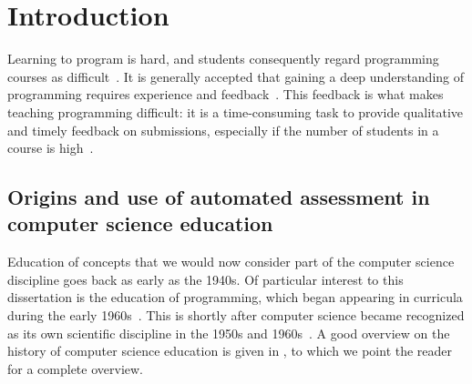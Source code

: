 \documentclass[../main]{subfiles}
\begin{document}
\chapter{Introduction}\label{ch:introduction}


Learning to program is hard, and students consequently regard programming courses as difficult~\autocite{robinsLearningTeachingProgramming2003,simoesNatureProgrammingExercises2020}.
It is generally accepted that gaining a deep understanding of programming requires experience and feedback~\autocite{gomesEnvironmentImproveProgramming2007,hattiePowerFeedback2007}.
This feedback is what makes teaching programming difficult: it is a time-consuming task to provide qualitative and timely feedback on submissions, especially if the number of students in a course is high~\autocite{zavalaUseSemanticbasedAIG2018,staubitzRepositoryOpenAutogradable2017,queirosPexilProgrammingExercises2011,pirttinenCrowdsourcingProgrammingAssignments2018,gulwaniFeedbackGenerationPerformance2014,tangDatadrivenTestCase2016}.

\section{Origins and use of automated assessment in computer science education}\label{sec:automated-assessment-in-computer-science-education}

Education of concepts that we would now consider part of the computer science discipline goes back as early as the 1940s.
Of particular interest to this dissertation is the education of programming, which began appearing in curricula during the early 1960s~\autocite{simonEmergenceComputingEducation2015}.
This is shortly after computer science became recognized as its own scientific discipline in the 1950s and 1960s~\autocite{hopcroftComputerScienceEmergence1987,atchisonComputerScienceNew1971,gornComputerInformationSciences1963,knuthComputerScienceIts1974,denningScienceComputerScience2013}.
A good overview on the history of computer science education is given in \textcite{tedreChangingAimsComputing2018}, to which we point the reader for a complete overview.
\end{document}
